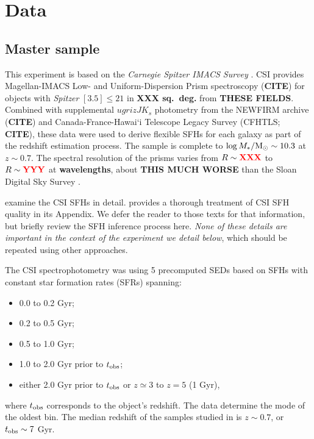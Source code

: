\documentclass[a4paper,fleqn,usenatbib]{mnras}
\newcommand{\Msun}{{\rm M}_\odot}
\newcommand{\Mstel}{M_\ast}
\newcommand{\logM}{\log\Mstel/\Msun}
\newcommand{\bfr}{\bf\color{red}}
\newcommand{\tobs}{t_{\rm obs}}
\newcommand{\bitem}{\begin{itemize}}
\newcommand{\eitem}{\end{itemize}}
\newcommand{\CITE}{{\bfr CITE}}
\begin{document}

\section{Data}
\label{sec:data}

\subsection{Master sample}
\label{sec:master}

This experiment is based on the {\it Carnegie Spitzer IMACS Survey} \citep[CSI;][]{Kelson14a}. CSI provides
Magellan-IMACS Low- and Uniform-Dispersion Prism spectroscopy (\CITE) for objects with {\it Spitzer} 
$[3.5]\leq21$ in {\bfr XXX sq.~deg.} from {\bfr THESE FIELDS}. Combined with supplemental 
$ugrizJK_{s}$ photometry from the NEWFIRM archive (\CITE) and Canada-France-Hawai`i Telescope 
Legacy Survey (CFHTLS; \CITE), these data were used to derive flexible SFHs for each galaxy as part of 
the redshift estimation process. The sample is complete to $\logM\sim10.3$ at $z\sim0.7$.
The spectral resolution of the prisms varies from $R\sim{\bfr XXX}$ to $R\sim{\bfr YYY}$ at
{\bfr wavelengths}, about {\bfr THIS MUCH WORSE} than the Sloan Digital Sky Survey \citep{York00}.

\citet{Dressler16, Dressler18} examine the CSI SFHs in detail. \citet{Dressler18} provides a thorough treatment 
of CSI SFH quality in its Appendix. We defer the reader to those texts for that information, but briefly review 
the SFH inference process here. {\it None of these details are important in the context of the experiment we 
detail below}, which should be repeated using other approaches.

The CSI spectrophotometry was using 5 precomputed SEDs based on SFHs with constant star formation 
rates (SFRs) spanning:
\bitem
	\item 0.0 to 0.2 Gyr; %
	\item 0.2 to 0.5 Gyr; %
	\item 0.5 to 1.0 Gyr; %
	\item 1.0 to 2.0 Gyr prior to $\tobs$;
	\item either 2.0 Gyr prior to $\tobs$ or $z\simeq 3$ to $z=5$ (1 Gyr),
\eitem
where $\tobs$ corresponds to the object's redshift. The data determine the mode of the oldest bin.
The median redshift of the samples studied in \citet{Dressler16, Dressler18} is $z\sim0.7$, or $\tobs\sim7$ Gyr.
\end{document}

